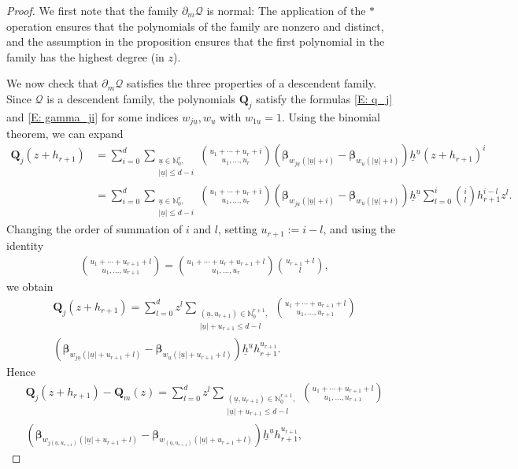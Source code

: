 \documentclass[11pt]{amsart}
\theoremstyle{definition}
\newcommand{\N}{{\mathbb N}}
\newcommand{\CQ}{{\mathcal Q}}
\newcommand{\bq}{{\mathbf{Q}}}
\newcommand{\bbeta}{{\boldsymbol{\beta}}}
\newcommand{\uh}{{\underline{h}}}
\newcommand{\uu}{{\underline{u}}}
\begin{document}
    \begin{proof}
        We first note that the family $\partial_m\CQ$ is normal: The application of the $*$ operation ensures that the polynomials of the family are nonzero and distinct, and the assumption in the proposition ensures that the first polynomial in the family has the highest degree (in $z$).

        We now check that $\partial_m\CQ$ satisfies the three properties of a descendent family.
        Since $\CQ$ is a descendent family, the polynomials $\bq_j$ satisfy the formulas \eqref{E: q_j} and \eqref{E: gamma_ji} for some indices $w_{j\uu}, w_\uu$ with $w_{1\uu}=1$.
        Using the binomial theorem, we can expand
        \begin{align*}
            \bq_j(z+h_{r+1}) &= \sum_{i=0}^d \sum_{\substack{\uu\in \N_0^r,\\ |\uu|\leq d-i}} {{{u_1+\cdots + u_r+i}\choose{u_1, \ldots, u_r}}}(\bbeta_{w_{j\uu}(|\uu|+i)}-\bbeta_{w_{\uu}(|\uu|+i)})\uh^\uu (z+h_{r+1})^i\\
            &=\sum_{i=0}^d \sum_{\substack{\uu\in \N_0^r,\\ |\uu|\leq d-i}} {{{u_1+\cdots + u_r+i}\choose{u_1, \ldots, u_r}}}(\bbeta_{w_{j\uu}(|\uu|+i)}-\bbeta_{w_{\uu}(|\uu|+i)})\uh^\uu \sum_{l=0}^i{{{i}\choose{l}}}h_{r+1}^{i-l}z^l.
        \end{align*}
        Changing the order of summation of $i$ and $l$,  setting $u_{r+1} := i-l$, and using the identity
        \begin{align*}
            {{{u_1+\cdots +u_{r+1}+l}\choose{u_1, \ldots, u_{r+1}}}} = {{{u_1+\cdots + u_r+u_{r+1}+l}\choose{u_1, \ldots, u_r}}}{{{u_{r+1}+l}\choose{l}}},
        \end{align*}
        we obtain
        \begin{multline*}
            \bq_j(z+h_{r+1}) = \sum_{l=0}^d z^l \sum_{\substack{(\uu, u_{r+1})\in \N_0^{r+1},\\ |\uu|+u_{r+1}\leq d-l}} {{{u_1+\cdots + u_{r+1}+l}\choose{u_1, \ldots, u_{r+1}}}}\\ (\bbeta_{w_{j\uu}(|\uu|+u_{r+1}+l)}-\bbeta_{w_{\uu}(|\uu|+u_{r+1}+l)})\uh^\uu h_{r+1}^{u_{r+1}}.
        \end{multline*}
        Hence 
        \begin{multline}\label{E: q_j - q_m}
             \bq_j(z+h_{r+1})-\bq_m(z) = \sum_{l=0}^d z^l \sum_{\substack{(\uu, u_{r+1})\in \N_0^{r+1},\\ |\uu|+u_{r+1}\leq d-l}} {{{u_1+\cdots + u_{r+1}+l}\choose{u_1, \ldots, u_{r+1}}}}\\ (\bbeta_{w_{j(\uu, u_{r+1})}(|\uu|+u_{r+1}+l)}-\bbeta_{w_{(\uu, u_{r+1})}(|\uu|+u_{r+1}+l)})\uh^\uu h_{r+1}^{u_{r+1}},

\end{multline}
\end{proof}
\end{document}
